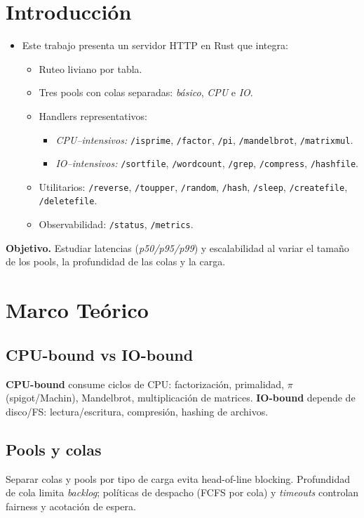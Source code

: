 \documentclass[conference]{IEEEtran}
\begin{document}
\section{Introducción}
\begin{itemize}
  \item {Este trabajo presenta un servidor HTTP en Rust} que integra:
    \begin{itemize}
      \item {Ruteo liviano por tabla.}
      \item {Tres pools con colas separadas:} \emph{básico}, \emph{CPU} e \emph{IO}.
      \item {Handlers representativos:}
        \begin{itemize}
          \item \emph{CPU–intensivos:} \texttt{/isprime}, \texttt{/factor}, \texttt{/pi}, \texttt{/mandelbrot}, \texttt{/matrixmul}.
          \item \emph{IO–intensivos:} \texttt{/sortfile}, \texttt{/wordcount}, \texttt{/grep}, \texttt{/compress}, \texttt{/hashfile}.
        \end{itemize}
      \item {Utilitarios:} \texttt{/reverse}, \texttt{/toupper}, \texttt{/random}, \texttt{/hash}, \texttt{/sleep}, \texttt{/createfile}, \texttt{/deletefile}.
      \item {Observabilidad:} \texttt{/status}, \texttt{/metrics}.
    \end{itemize}
\end{itemize}

\noindent\textbf{Objetivo.} Estudiar latencias (\emph{p50/p95/p99}) y escalabilidad al variar el tamaño de los pools, la profundidad de las colas y la carga.

\section{Marco Teórico}
\subsection{CPU-bound vs IO-bound}
\textbf{CPU-bound} consume ciclos de CPU: factorización, primalidad, $\pi$ (spigot/Machin), Mandelbrot, multiplicación de matrices. \textbf{IO-bound} depende de disco/FS: lectura/escritura, compresión, hashing de archivos.

\subsection{Pools y colas}
Separar colas y pools por tipo de carga evita head-of-line blocking. Profundidad de cola limita \emph{backlog}; políticas de despacho (FCFS por cola) y \emph{timeouts} controlan fairness y acotación de espera.
\end{document}
